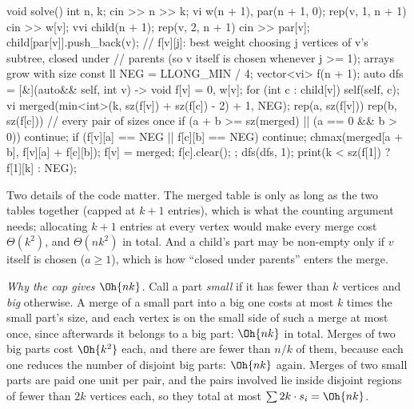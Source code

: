 \begin{code}
void solve() {
    int n, k;
    cin >> n >> k;
    vi w(n + 1), par(n + 1, 0);
    rep(v, 1, n + 1) cin >> w[v];
    vvi child(n + 1);
    rep(v, 2, n + 1) {
        cin >> par[v];
        child[par[v]].push_back(v);
    }
    // f[v][j]: best weight choosing j vertices of v's subtree, closed under
    // parents (so v itself is chosen whenever j >= 1); arrays grow with size
    const ll NEG = LLONG_MIN / 4;
    vector<vi> f(n + 1);
    auto dfs = [&](auto&& self, int v) -> void {
        f[v] = {0, w[v]};
        for (int c : child[v]) {
            self(self, c);
            vi merged(min<int>(k, sz(f[v]) + sz(f[c]) - 2) + 1, NEG);
            rep(a, sz(f[v])) rep(b, sz(f[c])) {  // every pair of sizes once
                if (a + b >= sz(merged) || (a == 0 && b > 0)) continue;
                if (f[v][a] == NEG || f[c][b] == NEG) continue;
                chmax(merged[a + b], f[v][a] + f[c][b]);
            }
            f[v] = merged;
            f[c].clear();
        }
    };
    dfs(dfs, 1);
    print(k < sz(f[1]) ? f[1][k] : NEG);
}
\end{code}


Two details of the code matter. The merged table is only as long as the two tables together (capped at $k + 1$ entries), which is
what the counting argument needs; allocating $k + 1$ entries at every vertex would make every merge cost $\Theta(k^2)$, and
$\Theta(nk^2)$ in total. And a child's part may be non-empty only if $v$ itself is chosen ($a \ge 1$), which is how ``closed under
parents'' enters the merge.

\emph{Why the cap gives $\Oh{nk}$.} Call a part \emph{small} if it has fewer than $k$ vertices and \emph{big} otherwise. A merge of
a small part into a big one costs at most $k$ times the small part's size, and each vertex is on the small side of such a merge at
most once, since afterwards it belongs to a big part: $\Oh{nk}$ in total. Merges of two big parts cost $\Oh{k^2}$ each, and there
are fewer than $n / k$ of them, because each one reduces the number of disjoint big parts: $\Oh{nk}$ again. Merges of two small
parts are paid one unit per pair, and the pairs involved lie inside disjoint regions of fewer than $2k$ vertices each, so they
total at most $\sum 2k \cdot s_i = \Oh{nk}$.

